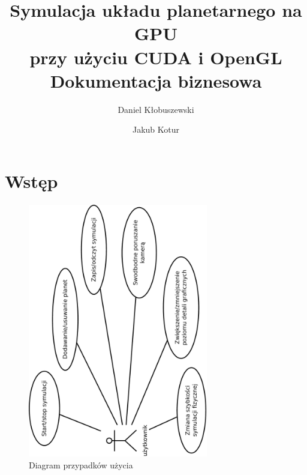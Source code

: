 \documentclass[a4paper,titlepage,10pt]{article}
\title{\huge Symulacja układu planetarnego na GPU\\ przy użyciu CUDA i OpenGL\\\small Dokumentacja biznesowa}
\author{Daniel Kłobuszewski\and Jakub Kotur}
\begin{document}
	\maketitle

	\section{Wstęp}\label{sec:wstep}
	
	\paragraph{}

\begin{figure}[h]
	\centering
	\includegraphics[width=0.7\textwidth,angle=-90]{use-case.pdf}
	\caption{Diagram przypadków użycia}
	\label{fig:use-case}
\end{figure}
\end{document}
